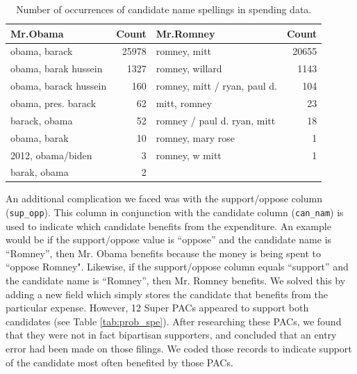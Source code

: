 \documentclass[11pt]{article}\usepackage{graphicx, color}
\begin{document}
\begin{table}[ht]
\begin{center}
\begin{tabular}{lrlr}
  \hline
Mr.Obama & Count & Mr.Romney & Count \\ 
  \hline
obama, barack & 25978 & romney, mitt & 20655 \\ 
  obama, barak hussein & 1327 & romney, willard & 1143 \\ 
  obama, barack hussein & 160 & romney, mitt / ryan, paul d. & 104 \\ 
  obama, pres. barack &  62 & mitt, romney &  23 \\ 
  barack, obama &  52 & romney / paul d. ryan, mitt &  18 \\ 
  obama, barak &  10 & romney, mary rose &   1 \\ 
  2012, obama/biden &   3 & romney, w mitt &   1 \\ 
  barak, obama &   2 &  &  \\ 
   \hline
\end{tabular}
\caption{Number of occurrences of candidate name spellings in spending data.}
\label{tab:can_nam}
\end{center}
\end{table}



An additional complication we faced was with the support/oppose column (\texttt{sup\_opp}). This column in conjunction with the candidate column (\texttt{can\_nam}) is used to indicate which candidate benefits from the expenditure. An example would be if the support/oppose value is ``oppose'' and the candidate name is ``Romney'', then Mr. Obama benefits because the money is being spent to ``oppose Romney". Likewise, if the support/oppose column equals ``support'' and the candidate name is ``Romney'', then Mr. Romney benefits. We solved this by adding a new field which simply stores the candidate that benefits from the particular expense.  However, 12 Super PACs appeared to support both candidates (see Table \ref{tab:prob_spe}). After researching these PACs, we found that they were not in fact bipartisan supporters, and concluded that an entry error had been made on those filings. We coded those records to indicate support of the candidate most often benefited by those PACs.
\end{document}
